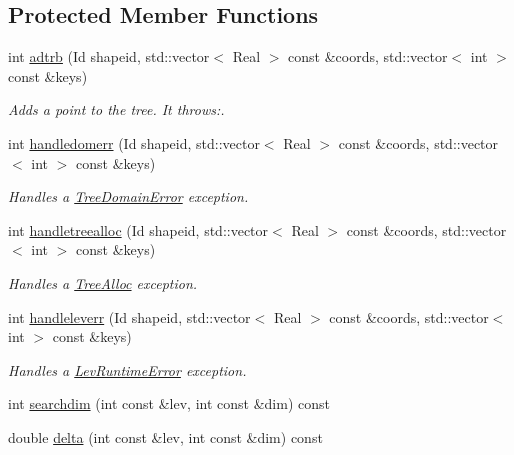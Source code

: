 \subsection*{Protected Member Functions}
\begin{DoxyCompactItemize}
\item 
int \hyperlink{classADTree_a813a21f8aa0566f8ec70bcef2c4cc748}{adtrb} (Id shapeid, std::vector$<$ Real $>$ const \&coords, std::vector$<$ int $>$ const \&keys)
\begin{DoxyCompactList}\small\item\em Adds a point to the tree. It throws:. \item\end{DoxyCompactList}\item 
\hypertarget{classADTree_ac8d1a7e1890bf2dda03e7e1996463510}{
int \hyperlink{classADTree_ac8d1a7e1890bf2dda03e7e1996463510}{handledomerr} (Id shapeid, std::vector$<$ Real $>$ const \&coords, std::vector$<$ int $>$ const \&keys)}
\label{classADTree_ac8d1a7e1890bf2dda03e7e1996463510}

\begin{DoxyCompactList}\small\item\em Handles a \hyperlink{classTreeDomainError}{TreeDomainError} exception. \item\end{DoxyCompactList}\item 
\hypertarget{classADTree_af57ba8e7855a92b06eab7a8ccfda8c95}{
int \hyperlink{classADTree_af57ba8e7855a92b06eab7a8ccfda8c95}{handletreealloc} (Id shapeid, std::vector$<$ Real $>$ const \&coords, std::vector$<$ int $>$ const \&keys)}
\label{classADTree_af57ba8e7855a92b06eab7a8ccfda8c95}

\begin{DoxyCompactList}\small\item\em Handles a \hyperlink{classTreeAlloc}{TreeAlloc} exception. \item\end{DoxyCompactList}\item 
\hypertarget{classADTree_aab479dc4be3ba0ba715efa3902415c88}{
int \hyperlink{classADTree_aab479dc4be3ba0ba715efa3902415c88}{handleleverr} (Id shapeid, std::vector$<$ Real $>$ const \&coords, std::vector$<$ int $>$ const \&keys)}
\label{classADTree_aab479dc4be3ba0ba715efa3902415c88}

\begin{DoxyCompactList}\small\item\em Handles a \hyperlink{classLevRuntimeError}{LevRuntimeError} exception. \item\end{DoxyCompactList}\item 
int \hyperlink{classADTree_a5f5dcde8e682a04c4e8c8c0e6defc595}{searchdim} (int const \&lev, int const \&dim) const 
\item 
double \hyperlink{classADTree_a70bf34ef5fddca65b241e9e296e26021}{delta} (int const \&lev, int const \&dim) const 
\end{DoxyCompactItemize}
